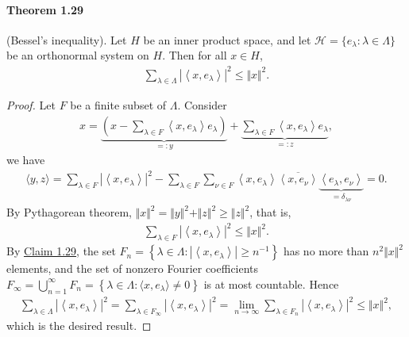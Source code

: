 \documentclass{article}
\begin{document}
\paragraph{Theorem 1.29\label{thm:1.29}} (Bessel's inequality). Let $H$ be an inner product space, and let $\mathscr{H}=\{e_\lambda:\lambda\in\Lambda\}$ be an orthonormal system on $H$. Then for all $x\in H$,
\begin{align*}
	\sum_{\lambda\in\Lambda}\left\vert\left\langle x,e_\lambda\right\rangle\right\vert^2\leq \Vert x\Vert^2.
\end{align*}
\begin{proof}
Let $F$ be a finite subset of $\Lambda$. Consider
\begin{align*}
	x=\underbrace{\left(x - \sum_{\lambda\in F}\left\langle x,e_\lambda\right\rangle e_\lambda\right)}_{=:y} + \underbrace{\sum_{\lambda\in F}\left\langle x,e_\lambda\right\rangle e_\lambda}_{=:z},
\end{align*}
we have
\begin{align*}
	\langle y,z\rangle = \sum_{\lambda\in F}\left\vert\left\langle x,e_\lambda\right\rangle\right\vert^2 - \sum_{\lambda\in F}\sum_{\nu\in F}\left\langle x,e_\lambda\right\rangle\overline{\left\langle x,e_\nu\right\rangle}\underbrace{\left\langle e_\lambda,e_\nu\right\rangle}_{=\delta_{\lambda\nu}} = 0.
\end{align*}
By Pythagorean theorem, $\Vert x\Vert^2 = \Vert y\Vert^2 + \Vert z\Vert^2 \geq \Vert z\Vert^2$, that is,
\begin{align*}
	\sum_{\lambda\in F}\left\vert\left\langle x,e_\lambda\right\rangle\right\vert^2\leq \Vert x\Vert^2.
\end{align*}
By \hyperref[claim:1.29]{Claim 1.29}, the set $F_n=\left\{\lambda\in\Lambda:\left\vert\left\langle x,e_\lambda\right\rangle\right\vert\geq n^{-1}\right\}$ has no more than $n^2\Vert x\Vert^2$ elements, and the set of nonzero Fourier coefficients $F_\infty=\bigcup_{n=1}^\infty F_n = \left\{\lambda\in\Lambda:\langle x,e_\lambda\rangle\neq 0\right\}$ is at most countable. Hence
\begin{align*}
	\sum_{\lambda\in \Lambda}\left\vert\left\langle x,e_\lambda\right\rangle\right\vert^2 = \sum_{\lambda\in F_\infty}\left\vert\left\langle x,e_\lambda\right\rangle\right\vert^2 = \lim_{n\to\infty}\sum_{\lambda\in F_n}\left\vert\left\langle x,e_\lambda\right\rangle\right\vert^2\leq\Vert x\Vert^2,
\end{align*}
which is the desired result.
\end{proof}
\end{document}
